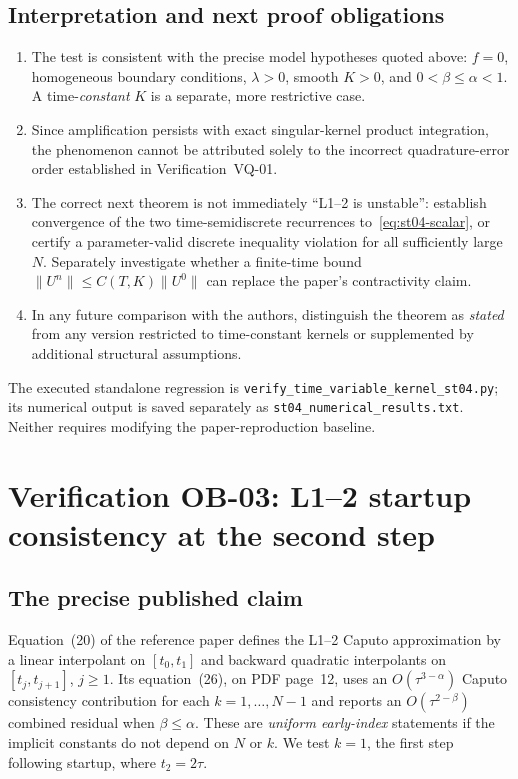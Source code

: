 \documentclass[11pt,a4paper]{amsart}
\theoremstyle{remark}
\theoremstyle{plain}
\theoremstyle{remark}
\numberwithin{equation}{section}
\begin{document}
\subsection{Interpretation and next proof obligations}
\begin{enumerate}
 \item The test is consistent with the precise model hypotheses quoted above: $f=0$, homogeneous boundary conditions, $\lambda>0$, smooth $K>0$, and $0<\beta\le\alpha<1$. A time-\emph{constant} $K$ is a separate, more restrictive case.
 \item Since amplification persists with exact singular-kernel product integration, the phenomenon cannot be attributed solely to the incorrect quadrature-error order established in Verification~VQ-01.
 \item The correct next theorem is not immediately ``L1--2 is unstable'': establish convergence of the two time-semidiscrete recurrences to~\eqref{eq:st04-scalar}, or certify a parameter-valid discrete inequality violation for all sufficiently large $N$. Separately investigate whether a finite-time bound $\|U^n\|\le C(T,K)\|U^0\|$ can replace the paper's contractivity claim.
 \item In any future comparison with the authors, distinguish the theorem as \emph{stated} from any version restricted to time-constant kernels or supplemented by additional structural assumptions.
\end{enumerate}
The executed standalone regression is \texttt{verify\_time\_variable\_kernel\_st04.py}; its numerical output is saved separately as \texttt{st04\_numerical\_results.txt}. Neither requires modifying the paper-reproduction baseline.


\section{Verification OB-03: L1--2 startup consistency at the second step}
\label{sec:startup-audit}

\subsection{The precise published claim}
Equation~(20) of the reference paper defines the L1--2 Caputo approximation by a linear interpolant on $[t_0,t_1]$ and backward quadratic interpolants on $[t_j,t_{j+1}]$, $j\ge1$. Its equation~(26), on PDF page~12, uses an $O(\tau^{3-\alpha})$ Caputo consistency contribution for each $k=1,\ldots,N-1$ and reports an $O(\tau^{2-\beta})$ combined residual when $\beta\le\alpha$. These are \emph{uniform early-index} statements if the implicit constants do not depend on $N$ or $k$. We test $k=1$, the first step following startup, where $t_2=2\tau$.
\end{document}

